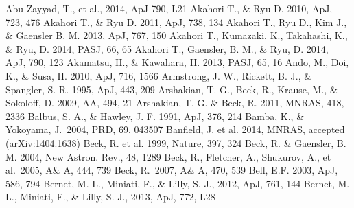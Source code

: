 \begin{thebibliography}{99}
\begin{multicols}{2}{\footnotesize
{}
	Abu-Zayyad, T., et al., 2014, ApJ 790, L21
	Akahori T., \& Ryu D. 2010, ApJ, 723, 476
	Akahori T., \& Ryu D. 2011, ApJ, 738, 134
	Akahori T., Ryu D., Kim J., \& Gaensler B. M. 2013, ApJ, 767, 150
	Akahori T., Kumazaki, K., Takahashi, K., \& Ryu, D. 2014, PASJ, 66, 65
	Akahori T., Gaensler, B. M., \& Ryu, D. 2014, ApJ, 790, 123
	Akamatsu, H., \& Kawahara, H. 2013, PASJ, 65, 16
	Ando, M., Doi, K., \& Susa, H. 2010, ApJ, 716, 1566
	Armstrong, J. W., Rickett, B. J., \& Spangler, S. R. 1995, ApJ, 443, 209
	Arshakian, T. G., Beck, R., Krause, M., \& Sokoloff, D. 2009, AA, 494, 21
	Arshakian, T. G. \& Beck, R. 2011, MNRAS, 418, 2336
	Balbus, S. A., \& Hawley, J. F. 1991, ApJ, 376, 214
	Bamba, K., \& Yokoyama, J.\ 2004, PRD, 69, 043507
	Banfield, J. et al. 2014, MNRAS, accepted (arXiv:1404.1638)
	Beck, R. et al. 1999, Nature, 397, 324
	Beck, R. \& Gaensler, B. M. 2004, New Astron. Rev., 48, 1289
	Beck, R., Fletcher, A., Shukurov, A., et al.\ 2005, A\& A, 444, 739 
	Beck, R.\ 2007, A\& A, 470, 539 
	Bell, E.F. 2003, ApJ, 586, 794
	Bernet, M. L., Miniati, F., \& Lilly, S. J., 2012, ApJ, 761, 144
	Bernet, M. L., Miniati, F., \& Lilly, S. J., 2013, ApJ, 772, L28
}
\end{multicols}
\end{thebibliography}
